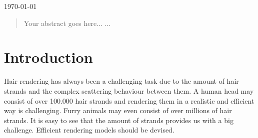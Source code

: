 \documentclass[11pt,a4paper]{report}
\begin{document}
\begin{titlepage}


{\large \today}\\[3cm] %


 

\vfill %

\end{titlepage}

%
%
\begin{abstract}
Your abstract goes here...
...
\end{abstract}

%
%
\tableofcontents

\chapter{Introduction}


Hair rendering has always been a challenging task due to the amount of hair strands and the complex scattering behaviour between them. A human head may consist of over 100.000 hair strands and rendering them in a realistic and efficient way is challenging. Furry animals may even consist of over millions of hair strands. It is easy to see that the amount of strands provides us with a big challenge. Efficient rendering models should be devised.\\
\end{document}
